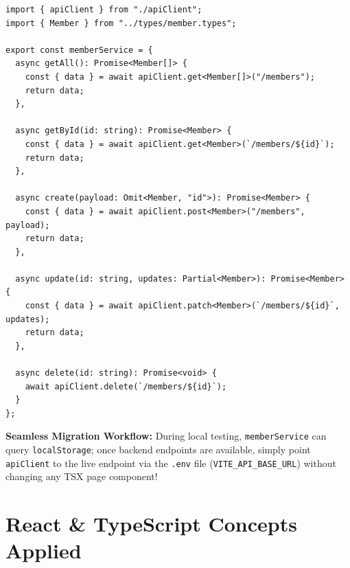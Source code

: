\documentclass[11pt,a4paper]{article}
\newcommand{\infobox}[1]{%
\begin{tcolorbox}[
    enhanced,
    breakable,
    colback=accentorange!5,
    colframe=accentorange!40,
    boxrule=0.6pt,
    arc=1mm,
    left=10pt, right=10pt, top=8pt, bottom=8pt
]
\small #1
\end{tcolorbox}
\vspace{4pt}
}
\begin{document}
\begin{lstlisting}[caption={services/memberService.ts (Typed Service Pattern)}]
import { apiClient } from "./apiClient";
import { Member } from "../types/member.types";

export const memberService = {
  async getAll(): Promise<Member[]> {
    const { data } = await apiClient.get<Member[]>("/members");
    return data;
  },

  async getById(id: string): Promise<Member> {
    const { data } = await apiClient.get<Member>(`/members/${id}`);
    return data;
  },

  async create(payload: Omit<Member, "id">): Promise<Member> {
    const { data } = await apiClient.post<Member>("/members", payload);
    return data;
  },

  async update(id: string, updates: Partial<Member>): Promise<Member> {
    const { data } = await apiClient.patch<Member>(`/members/${id}`, updates);
    return data;
  },

  async delete(id: string): Promise<void> {
    await apiClient.delete(`/members/${id}`);
  }
};
\end{lstlisting}

\infobox{\textbf{Seamless Migration Workflow:} During local testing, \texttt{memberService} can query \texttt{localStorage}; once backend endpoints are available, simply point \texttt{apiClient} to the live endpoint via the \texttt{.env} file (\texttt{VITE\_API\_BASE\_URL}) without changing any TSX page component!}

\newpage
\section{React \& TypeScript Concepts Applied}
\end{document}
